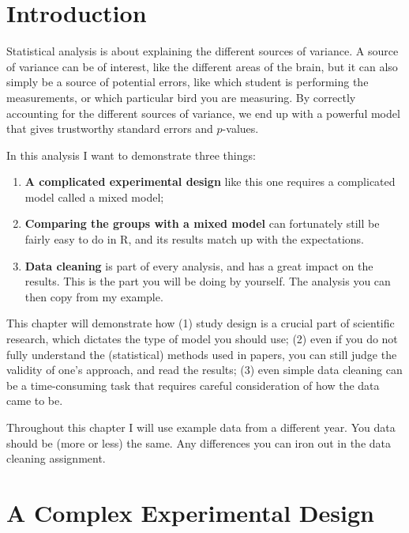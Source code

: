 \documentclass[
]{book}
\providecommand{\tightlist}{%
  \setlength{\itemsep}{0pt}\setlength{\parskip}{0pt}}
\begin{document}
\hypertarget{introduction}{%
\section{Introduction}\label{introduction}}

Statistical analysis is about explaining the different sources of variance. A source of variance can be of interest, like the different areas of the brain, but it can also simply be a source of potential errors, like which student is performing the measurements, or which particular bird you are measuring. By correctly accounting for the different sources of variance, we end up with a powerful model that gives trustworthy standard errors and \(p\)-values.

In this analysis I want to demonstrate three things:

\begin{enumerate}
\def\labelenumi{\arabic{enumi}.}
\tightlist
\item
  \textbf{A complicated experimental design} like this one requires a complicated model called a mixed model;
\item
  \textbf{Comparing the groups with a mixed model} can fortunately still be fairly easy to do in R, and its results match up with the expectations.
\item
  \textbf{Data cleaning} is part of every analysis, and has a great impact on the results. This is the part you will be doing by yourself. The analysis you can then copy from my example.
\end{enumerate}

This chapter will demonstrate how (1) study design is a crucial part of scientific research, which dictates the type of model you should use; (2) even if you do not fully understand the (statistical) methods used in papers, you can still judge the validity of one's approach, and read the results; (3) even simple data cleaning can be a time-consuming task that requires careful consideration of how the data came to be.

Throughout this chapter I will use example data from a different year. You data should be (more or less) the same. Any differences you can iron out in the data cleaning assignment.

\hypertarget{a-complex-experimental-design}{%
\section{A Complex Experimental Design}\label{a-complex-experimental-design}}
\end{document}
